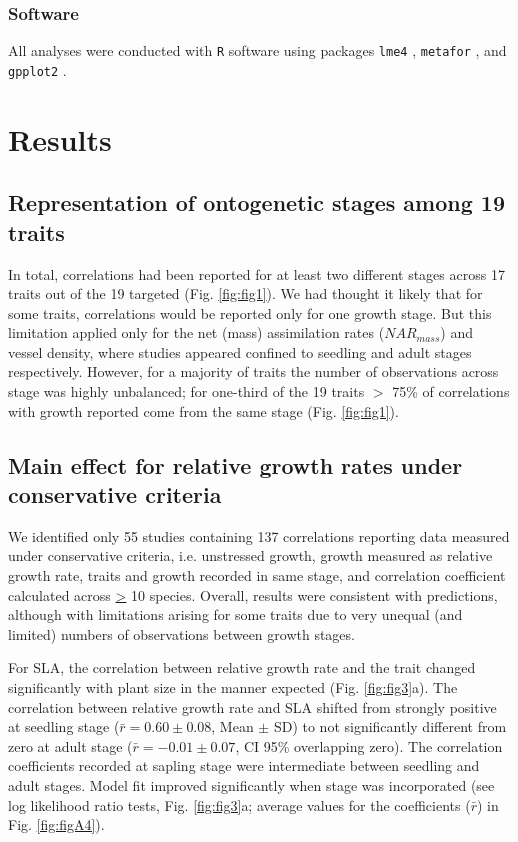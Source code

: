 \documentclass[a4paper,11pt]{article}
\begin{document}
\subsubsection*{Software}

All analyses were conducted with \texttt{R} software \citep{Ralanguageanden:2014wf} using packages \texttt{lme4} \citep{Bates-2014}, \texttt{metafor} \citep{Viechtbauer-2010}, and \texttt{gpplot2} \citep{Wickham:2009}.


\section*{Results}\label{results}

\subsection*{Representation of ontogenetic stages among 19 traits}
In total, correlations had been reported for at least two different stages across 17 traits out of the 19 targeted (Fig. \ref{fig:fig1}). We had thought it likely that for some traits, correlations would be reported only for one growth stage. But this limitation applied only for the net (mass) assimilation rates ($NAR_{mass}$) and vessel density, where studies appeared confined to seedling and adult stages respectively. However, for a majority of traits the number of observations across stage was highly unbalanced; for one-third of the 19 traits $>$ 75\% of correlations with growth reported come from the same stage (Fig. \ref{fig:fig1}).

\subsection*{Main effect for relative growth rates under conservative criteria}

We identified only 55 studies containing 137 correlations reporting data measured under conservative criteria, i.e. unstressed growth, growth measured as relative growth rate, traits and growth recorded in same stage, and correlation coefficient calculated across \underline{\textgreater} 10 species. Overall, results were consistent with predictions, although with limitations arising for some traits due to very unequal (and limited) numbers of observations between growth stages.

For SLA, the correlation between relative growth rate and the trait changed significantly with plant size in the manner expected (Fig. \ref{fig:fig3}a). The correlation between relative growth rate and SLA shifted from strongly positive at seedling stage ($\bar{r}=0.60 \pm 0.08$, Mean $\pm$ SD) to not significantly different from zero at adult stage ($\bar{r}= -0.01 \pm 0.07$, CI 95\% overlapping zero). The correlation coefficients recorded at sapling stage were intermediate between seedling and adult stages. Model fit improved significantly when stage was incorporated (see log likelihood ratio tests, Fig. \ref{fig:fig3}a; average values for the coefficients ($\bar{r}$) in Fig. \ref{fig:figA4}).
\end{document}
